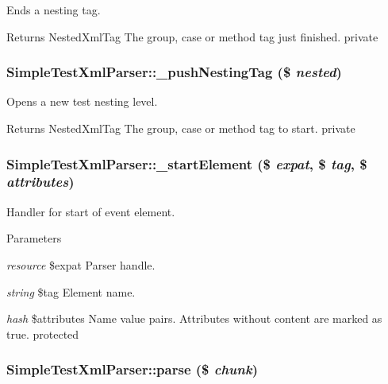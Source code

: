 \label{class_simple_test_xml_parser_ade10e92d51ae121640bc16aa7d73e581}
Ends a nesting tag. \begin{DoxyReturn}{Returns}
NestedXmlTag The group, case or method tag just finished.  private 
\end{DoxyReturn}
\hypertarget{class_simple_test_xml_parser_ac3481993c4f5916b3b1039ac55b76d53}{
\subsubsection[{\_\-pushNestingTag}]{\setlength{\rightskip}{0pt plus 5cm}SimpleTestXmlParser::\_\-pushNestingTag (\$ {\em nested})}}
\label{class_simple_test_xml_parser_ac3481993c4f5916b3b1039ac55b76d53}
Opens a new test nesting level. \begin{DoxyReturn}{Returns}
NestedXmlTag The group, case or method tag to start.  private 
\end{DoxyReturn}
\hypertarget{class_simple_test_xml_parser_ae6de8ccde9c5bed8742498edf6818cdb}{
\subsubsection[{\_\-startElement}]{\setlength{\rightskip}{0pt plus 5cm}SimpleTestXmlParser::\_\-startElement (\$ {\em expat}, \/  \$ {\em tag}, \/  \$ {\em attributes})}}
\label{class_simple_test_xml_parser_ae6de8ccde9c5bed8742498edf6818cdb}
Handler for start of event element. 
\begin{DoxyParams}{Parameters}
\item[{\em resource}]\$expat Parser handle. \item[{\em string}]\$tag Element name. \item[{\em hash}]\$attributes Name value pairs. Attributes without content are marked as true.  protected \end{DoxyParams}
\hypertarget{class_simple_test_xml_parser_af5eff8c0132f452c47bca965d6ff37ed}{
\subsubsection[{parse}]{\setlength{\rightskip}{0pt plus 5cm}SimpleTestXmlParser::parse (\$ {\em chunk})}}
